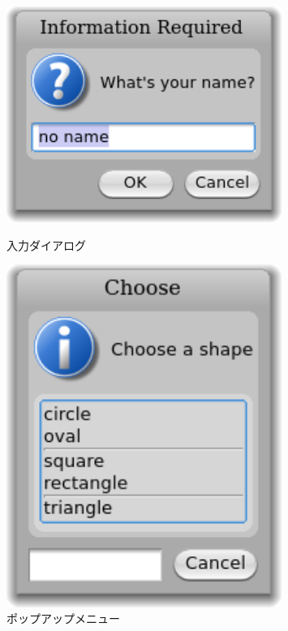 \documentclass[a4paper,10pt,twoside]{book}
\begin{document}
\begin{figure}[htb]
\begin{minipage}{0.48\textwidth}
	\centerline{\includegraphics[width=0.8\textwidth]{dialog}}
	\caption{入力ダイアログ}
\end{minipage}
\hfill
\begin{minipage}{0.48\textwidth}
	\vfill
	\centerline{\includegraphics [width=0.8\textwidth]{popup}}
	\vfill
	\vspace{4ex}
	\caption{ポップアップメニュー}
\end{minipage}
\end{figure}
\end{document}
